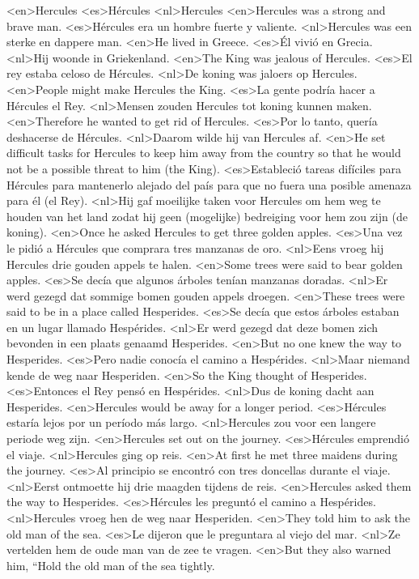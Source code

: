 <en>Hercules
<es>Hércules
<nl>Hercules
<en>Hercules was a strong and brave man.
<es>Hércules era un hombre fuerte y valiente.
<nl>Hercules was een sterke en dappere man.
<en>He lived in Greece.
<es>Él vivió en Grecia.
<nl>Hij woonde in Griekenland.
<en>The King was jealous of Hercules.
<es>El rey estaba celoso de Hércules.
<nl>De koning was jaloers op Hercules.
<en>People might make Hercules the King.
<es>La gente podría hacer a Hércules el Rey.
<nl>Mensen zouden Hercules tot koning kunnen maken.
<en>Therefore he wanted to get rid of Hercules.
<es>Por lo tanto, quería deshacerse de Hércules.
<nl>Daarom wilde hij van Hercules af.
<en>He set difficult tasks for Hercules to keep him away from the country so that he would not be a possible threat to him (the King).
<es>Estableció tareas difíciles para Hércules para mantenerlo alejado del país para que no fuera una posible amenaza para él (el Rey).
<nl>Hij gaf moeilijke taken voor Hercules om hem weg te houden van het land zodat hij geen (mogelijke) bedreiging voor hem zou zijn (de koning).
<en>Once he asked Hercules to get three golden apples.
<es>Una vez le pidió a Hércules que comprara tres manzanas de oro.
<nl>Eens vroeg hij Hercules  drie gouden appels te halen.
<en>Some trees were said to bear golden apples.
<es>Se decía que algunos árboles tenían manzanas doradas.
<nl>Er werd gezegd dat  sommige bomen gouden appels droegen.
<en>These trees were said to be in a place called Hesperides.
<es>Se decía que estos árboles estaban en un lugar llamado Hespérides.
<nl>Er werd  gezegd dat deze bomen zich  bevonden in een plaats genaamd Hesperides.
<en>But no one knew the way to Hesperides.
<es>Pero nadie conocía el camino a Hespérides.
<nl>Maar niemand kende de weg naar Hesperiden.
<en>So the King thought of Hesperides.
<es>Entonces el Rey pensó en Hespérides.
<nl>Dus de koning dacht aan Hesperides.
<en>Hercules would be away for a longer period.
<es>Hércules estaría lejos por un período más largo.
<nl>Hercules zou voor een langere periode weg zijn.
<en>Hercules set out on the journey.
<es>Hércules emprendió el viaje.
<nl>Hercules ging op reis.
<en>At first he met three maidens during the journey.
<es>Al principio se encontró con tres doncellas durante el viaje.
<nl>Eerst ontmoette hij drie maagden tijdens de reis.
<en>Hercules asked them the way to Hesperides.
<es>Hércules les preguntó el camino a Hespérides.
<nl>Hercules vroeg hen de weg naar Hesperiden.
<en>They told him to ask the old man of the sea.
<es>Le dijeron que le preguntara al viejo del mar.
<nl>Ze vertelden hem de oude man van de zee te vragen.
<en>But they also warned him, “Hold the old man of the sea tightly.
